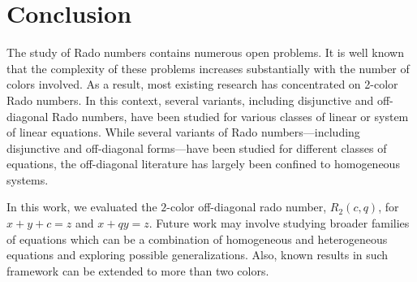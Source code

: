 \documentclass[preprint,12pt]{elsarticle}
\theoremstyle{plain}
\theoremstyle{definition}
\begin{document}
\section{Conclusion}
The study of Rado numbers contains numerous open problems. It is well known that the complexity of these problems increases substantially with the number of colors involved. As a result, most existing research has concentrated on 2-color Rado numbers. In this context, several variants, including disjunctive  and off-diagonal Rado numbers, have been studied for various classes of linear or system of linear equations. While several variants of Rado numbers—including disjunctive \cite{johnson2005disjunctive} and off-diagonal \cite{jing2024some,myers_offdiagonal2006,robertson_schaal2001} forms—have been studied for different classes of equations, the off-diagonal literature has largely been confined to homogeneous systems. 

In this work, we evaluated the $2$-color off-diagonal rado number, $R_2(c,q)$, for $x+y+c=z$ and  $x+qy=z$. Future work may involve studying broader families of equations which can be a combination of homogeneous and heterogeneous equations and exploring possible generalizations. Also, known results in such framework can be extended to more than two colors.


\end{document}
